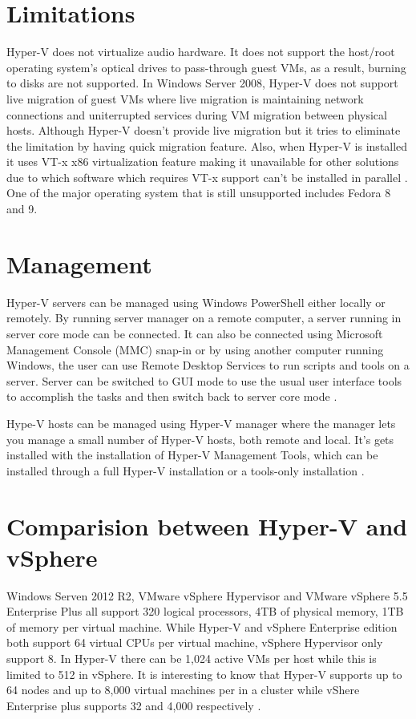\documentclass[9pt,twocolumn,twoside]{../../styles/osajnl}
\begin{document}
\section{Limitations}

Hyper-V does not virtualize audio hardware. It does not support the
host/root operating system's optical drives to pass-through guest VMs,
as a result, burning to disks are not supported. In Windows Server
2008, Hyper-V does not support live migration of guest VMs where live
migration is maintaining network connections and uniterrupted services
during VM migration between physical hosts. Although Hyper-V doesn't
provide live migration but it tries to eliminate the limitation by
having quick migration feature. Also, when Hyper-V is installed it
uses VT-x x86 virtualization feature making it unavailable for other
solutions due to which software which requires VT-x support can't be
installed in parallel \cite{www-hyperv-wikipedia}. One of the major
operating system that is still unsupported includes Fedora 8 and 9.

\section{Management}

Hyper-V servers can be managed using Windows PowerShell either locally
or remotely. By running server manager on a remote computer, a server
running in server core mode can be connected. It can also be connected
using Microsoft Management Console (MMC) snap-in or by using another
computer running Windows, the user can use Remote Desktop Services to
run scripts and tools on a server. Server can be switched to GUI mode
to use the usual user interface tools to accomplish the tasks and then
switch back to server core mode \cite{www-microsoft-technet}. 

Hype-V hosts can be managed using Hyper-V manager where the manager
lets you manage a small number of Hyper-V hosts, both remote and
local. It's gets installed with the installation of Hyper-V Management
Tools, which can be installed through a full Hyper-V installation or a
tools-only installation \cite{www-microsoft-technet}.

\section{Comparision between Hyper-V and vSphere}

Windows Serven 2012 R2, VMware vSphere Hypervisor and VMware vSphere
5.5 Enterprise Plus all support 320 logical processors, 4TB of
physical memory, 1TB of memory per virtual machine. While Hyper-V and
vSphere Enterprise edition both support 64 virtual CPUs per virtual
machine, vSphere Hypervisor only support 8. In Hyper-V there can be
1,024 active VMs per host while this is limited to 512 in vSphere. It
is interesting to know that Hyper-V supports up to 64 nodes and up to
8,000 virtual machines per in a cluster while vShere Enterprise plus
supports 32 and 4,000 respectively \cite{www-hyperv-paper}.
\end{document}
